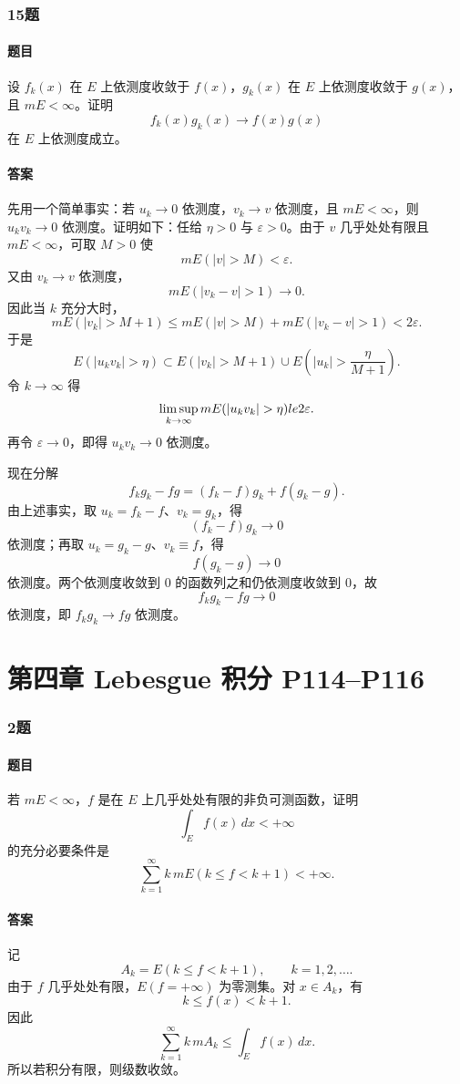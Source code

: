 \documentclass{article}
\newcommand{\eps}{\varepsilon}
\begin{document}
	\subsubsection*{15题}
	\paragraph{题目} 设 $f_k(x)$ 在 $E$ 上依测度收敛于 $f(x)$，$g_k(x)$ 在 $E$ 上依测度收敛于 $g(x)$，且 $mE<\infty$。证明
	\[
	f_k(x)g_k(x)\to f(x)g(x)
	\]
	在 $E$ 上依测度成立。
	
	\paragraph{答案} 先用一个简单事实：若 $u_k\to0$ 依测度，$v_k\to v$ 依测度，且 $mE<\infty$，则 $u_kv_k\to0$ 依测度。证明如下：任给 $\eta>0$ 与 $\eps>0$。由于 $v$ 几乎处处有限且 $mE<\infty$，可取 $M>0$ 使
	\[
	mE(|v|>M)<\eps.
	\]
	又由 $v_k\to v$ 依测度，
	\[
	mE(|v_k-v|>1)\to0.
	\]
	因此当 $k$ 充分大时，
	\[
	mE(|v_k|>M+1)
	\le mE(|v|>M)+mE(|v_k-v|>1)<2\eps.
	\]
	于是
	\[
	E(|u_kv_k|>\eta)
	\subset E(|v_k|>M+1)\cup E\left(|u_k|>\frac{\eta}{M+1}\right).
	\]
	令 $k\to\infty$ 得
	\[
	\limsup_{k\to\infty}mE(|u_kv_k|>\eta)\\le 2\eps.
	\]
	再令 $\eps\to0$，即得 $u_kv_k\to0$ 依测度。
	
	现在分解
	\[
	f_kg_k-fg=(f_k-f)g_k+f(g_k-g).
	\]
	由上述事实，取 $u_k=f_k-f$、$v_k=g_k$，得
	\[
	(f_k-f)g_k\to0
	\]
	依测度；再取 $u_k=g_k-g$、$v_k\equiv f$，得
	\[
	f(g_k-g)\to0
	\]
	依测度。两个依测度收敛到 $0$ 的函数列之和仍依测度收敛到 $0$，故
	\[
	f_kg_k-fg\to0
	\]
	依测度，即 $f_kg_k\to fg$ 依测度。
	
	\section*{第四章 \quad Lebesgue 积分 \quad P114--P116}
	
	\subsubsection*{2题}
	\paragraph{题目} 若 $mE<\infty$，$f$ 是在 $E$ 上几乎处处有限的非负可测函数，证明
	\[
	\int_E f(x)\,dx<+\infty
	\]
	的充分必要条件是
	\[
	\sum_{k=1}^{\infty} k\,mE(k\le f<k+1)<+\infty.
	\]
	
	\paragraph{答案} 记
	\[
	A_k=E(k\le f<k+1),\qquad k=1,2,\ldots.
	\]
	由于 $f$ 几乎处处有限，$E(f=+\infty)$ 为零测集。对 $x\in A_k$，有
	\[
	k\le f(x)<k+1.
	\]
	因此
	\[
	\sum_{k=1}^{\infty} k\,mA_k
	\le \int_E f(x)\,dx.
	\]
	所以若积分有限，则级数收敛。
	
\end{document}
